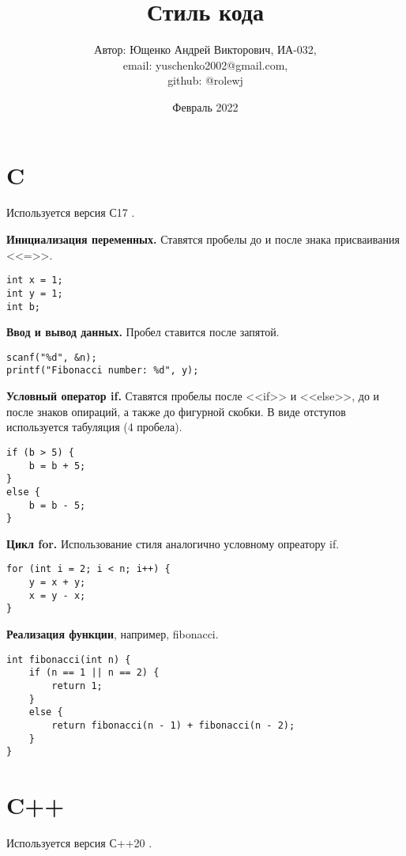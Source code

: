 \documentclass{article}
\begin{document}
\title{Стиль кода}
\author{Автор: Ющенко Андрей Викторович, ИА-032,\\ email: yuschenko2002@gmail.com,\\ github: @rolewj}
\date{Февраль 2022}

\maketitle

\section{C}
Используется версия С17 \cite{C}.\vspace{5mm}

\textbf{Инициализация переменных.} Ставятся пробелы до и после знака присваивания <<=>>.
\begin{lstlisting}[caption=Инициализация переменных.]
int x = 1;
int y = 1;
int b;
\end{lstlisting}

\textbf{Ввод и вывод данных.} Пробел ставится после запятой.
\begin{lstlisting}[caption=Ввод и вывод данных.]
scanf("%d", &n);
printf("Fibonacci number: %d", y);
\end{lstlisting}

\textbf{Условный оператор if.} Ставятся пробелы после <<if>> и <<else>>, до и после знаков опираций, а также до фигурной скобки. В виде отступов используется табуляция (4 пробела).
\begin{lstlisting}[caption=Условный оператор if.]
if (b > 5) {
    b = b + 5;
}
else {
    b = b - 5;
}
\end{lstlisting}

\textbf{Цикл for.} Использование стиля аналогично условному опреатору if.
\begin{lstlisting}[caption=Цикл for.]
for (int i = 2; i < n; i++) {
    y = x + y;
    x = y - x;
}
\end{lstlisting}

\textbf{Реализация функции}, например, fibonacci.
\begin{lstlisting}[caption=Реализация функции.]
int fibonacci(int n) {
    if (n == 1 || n == 2) {
        return 1;
    } 
    else {
        return fibonacci(n - 1) + fibonacci(n - 2);
    }
}
\end{lstlisting}

\section{C++}
Используется версия С++20 \cite{C++}.\vspace{5mm}
\end{document}
